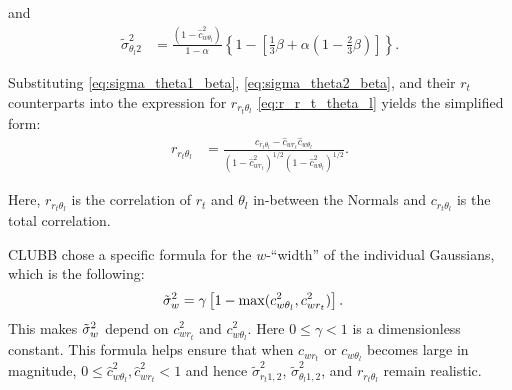 and
\begin{align}
    \label{eq:sigma_theta2_beta}
    \tilde{\sigma}_{\theta_l 2}^2
    &= \frac{\left(1 - \widehat{c}_{w \theta_l}^2\right)} {1 - \alpha} \left\{1 - \left[\frac{1}{3}\beta + \alpha \left(1 - \frac{2}{3} \beta \right)\right]\right\}.
\end{align}

Substituting \cref{eq:sigma_theta1_beta}, \cref{eq:sigma_theta2_beta}, and their $r_t$ counterparts into the expression for $r_{r_t \theta_l}$ \cref{eq:r_r_t_theta_l} yields the simplified form:
\begin{align}
    \label{eq:r_r_t_theta_l_beta}
    r_{r_t \theta_l}
    &= \frac{c_{r_t \theta_l} - \widehat{c}_{w r_t} \widehat{c}_{w \theta_l}}{\left(1 - \widehat{c}_{w r_t}^2\right)^{1/2} \left(1 - \widehat{c}_{w \theta_l}^2\right)^{1/2}}.
\end{align}

Here, $r_{r_t \theta_l}$ is the correlation of $r_t$ and $\theta_l$ in-between the Normals and $c_{r_t \theta_l}$ is the total correlation.

\gls{CLUBB} chose a specific formula for the $w$-\enquote{width} of the individual Gaussians, which is the following:
\begin{align}
    \label{eq:sigma_tilde_w_restricted}
    {\tilde{\sigma}_w}^2
    &= \gamma \left[1 - \max(c_{w \theta_l}^2, c_{w r_t}^2) \right].
\end{align}
This makes ${\tilde{\sigma}_w}^2$ depend on $c_{w r_t}^2$ and $c_{w \theta_l}^2$.
Here $0 \leq \gamma < 1$ is a dimensionless constant.
This formula helps ensure that when $c_{w r_t}$ or $c_{w \theta_l}$ becomes large in magnitude, $0 \leq \widehat{c}_{w \theta_l}^2, \widehat{c}_{w r_t}^2 < 1$ and hence $\tilde{\sigma}_{r_t 1,2}^2$, $\tilde{\sigma}_{\theta_l 1,2}^2$, and $r_{r_t \theta_l}$ remain realistic.